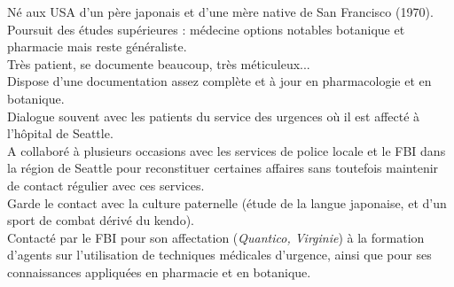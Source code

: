 \documentclass[11pt,twoside,a4paper]{article}
\begin{document}
N{\'e} aux USA d'un p{\`e}re japonais et d'une m{\`e}re native de San Francisco (1970). \dotfill ~\\
Poursuit des {\'e}tudes sup{\'e}rieures : m{\'e}decine options notables botanique et pharmacie mais reste g{\'e}n{\'e}raliste. \dotfill ~\\
Tr{\`e}s patient, se documente beaucoup, tr{\`e}s m{\'e}ticuleux... \dotfill ~\\
Dispose d'une documentation assez compl{\`e}te et {\`a} jour en pharmacologie et en botanique. \dotfill ~\\
Dialogue souvent avec les patients du service des urgences o{\`u} il est affect{\'e} {\`a} l'h{\^o}pital de Seattle. \dotfill ~\\
A collabor{\'e} {\`a} plusieurs occasions avec les services de police locale et le FBI dans la r{\'e}gion de Seattle pour reconstituer certaines affaires sans toutefois maintenir de contact r{\'e}gulier avec ces services. \dotfill ~\\
Garde le contact avec la culture paternelle ({\'e}tude de la langue japonaise, et d'un sport de combat d{\'e}riv{\'e} du kendo). \dotfill ~\\


Contact{\'e} par le FBI pour son affectation (\emph{Quantico, Virginie}) {\`a} la formation d'agents sur l'utilisation de techniques m{\'e}dicales d'urgence, ainsi que pour ses connaissances appliqu{\'e}es en pharmacie et en botanique. \dotfill ~\\
\end{document}
